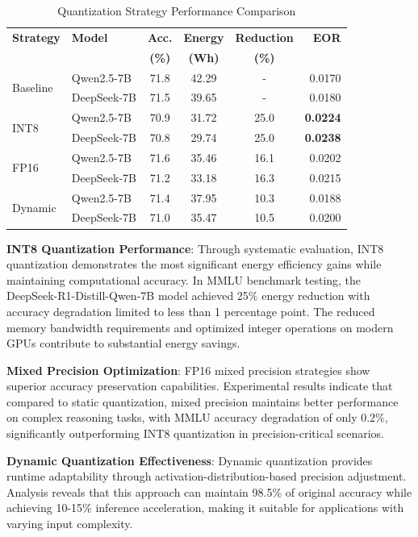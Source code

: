 \documentclass[sigconf]{acmart}
\begin{document}
\begin{table}[h]
\centering
\caption{Quantization Strategy Performance Comparison}
\label{tab:quantization}
\small
\begin{tabular}{@{}lp{1.8cm}cccr@{}}
\toprule
\textbf{Strategy} & \textbf{Model} & \textbf{Acc.} & \textbf{Energy} & \textbf{Reduction} & \textbf{EOR} \\
 & & \textbf{(\%)} & \textbf{(Wh)} & \textbf{(\%)} & \\
\midrule
\multirow{2}{*}{Baseline} & Qwen2.5-7B & 71.8 & 42.29 & - & 0.0170 \\
& DeepSeek-7B & 71.5 & 39.65 & - & 0.0180 \\
\midrule
\multirow{2}{*}{INT8} & Qwen2.5-7B & 70.9 & 31.72 & 25.0 & \textbf{0.0224} \\
& DeepSeek-7B & 70.8 & 29.74 & 25.0 & \textbf{0.0238} \\
\midrule
\multirow{2}{*}{FP16} & Qwen2.5-7B & 71.6 & 35.46 & 16.1 & 0.0202 \\
& DeepSeek-7B & 71.2 & 33.18 & 16.3 & 0.0215 \\
\midrule
\multirow{2}{*}{Dynamic} & Qwen2.5-7B & 71.4 & 37.95 & 10.3 & 0.0188 \\
& DeepSeek-7B & 71.0 & 35.47 & 10.5 & 0.0200 \\
\bottomrule
\end{tabular}
\end{table}

\textbf{INT8 Quantization Performance}: Through systematic evaluation, INT8 quantization demonstrates the most significant energy efficiency gains while maintaining computational accuracy. In MMLU benchmark testing, the DeepSeek-R1-Distill-Qwen-7B model achieved 25\% energy reduction with accuracy degradation limited to less than 1 percentage point. The reduced memory bandwidth requirements and optimized integer operations on modern GPUs contribute to substantial energy savings.

\textbf{Mixed Precision Optimization}: FP16 mixed precision strategies show superior accuracy preservation capabilities. Experimental results indicate that compared to static quantization, mixed precision maintains better performance on complex reasoning tasks, with MMLU accuracy degradation of only 0.2\%, significantly outperforming INT8 quantization in precision-critical scenarios.

\textbf{Dynamic Quantization Effectiveness}: Dynamic quantization provides runtime adaptability through activation-distribution-based precision adjustment. Analysis reveals that this approach can maintain 98.5\% of original accuracy while achieving 10-15\% inference acceleration, making it suitable for applications with varying input complexity.
\end{document}
